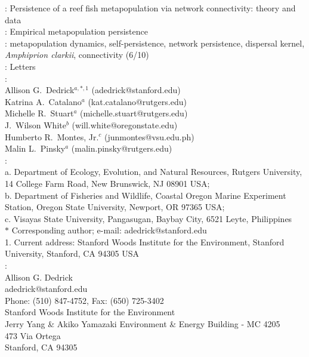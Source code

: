 \documentclass[12pt, oneside]{article}   	%
\begin{document}
\renewcommand{\topfraction}{0.95}

\begin{singlespace*}
: Persistence of a reef fish metapopulation via network connectivity: theory and data \\

: Empirical metapopulation persistence \\

: metapopulation dynamics, self-persistence, network persistence, dispersal kernel, \textit{Amphiprion clarkii}, connectivity (6/10) \\ 

: Letters \\ 

: \\ 
Allison G.\ Dedrick$^{a, \ast, 1}$ (adedrick@stanford.edu) \\
Katrina A.\ Catalano$^a$ (kat.catalano@rutgers.edu) \\
Michelle R.\ Stuart$^a$ (michelle.stuart@rutgers.edu) \\
J.\ Wilson White$^b$ (will.white@oregonstate.edu) \\
Humberto R.\ Montes, Jr.$^c$ (junmontes@vsu.edu.ph) \\
Malin L.\ Pinsky$^a$ (malin.pinsky@rutgers.edu) \\

: \\
\noindent{} a. Department of Ecology, Evolution, and Natural Resources, Rutgers University, 14 College Farm Road, New Brunswick, NJ 08901 USA; \\
\noindent{} b. Department of Fisheries and Wildlife, Coastal Oregon Marine Experiment Station, Oregon State University, Newport, OR 97365 USA; \\
\noindent{} c. Visayas State University, Pangasugan, Baybay City, 6521 Leyte, Philippines \\
\noindent{} $\ast$ Corresponding author; e-mail: adedrick@stanford.edu \\
\noindent{} 1. Current address: Stanford Woods Institute for the Environment, Stanford University, Stanford, CA 94305 USA \\

: \\
\noindent{} Allison G. Dedrick \\ 
\noindent{} adedrick@stanford.edu \\
\noindent{} Phone: (510) 847-4752, Fax: (650) 725-3402 \\
\noindent{} Stanford Woods Institute for the Environment \\
\noindent{} Jerry Yang \& Akiko Yamazaki Environment \& Energy Building - MC 4205 \\
\noindent{} 473 Via Ortega \\
\noindent{} Stanford, CA 94305 \\ 


\end{singlespace*}
\end{document}

